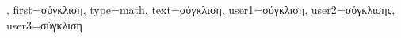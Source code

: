 {{%
},
	first={\foreignlanguage{greek}{σύγκλιση}},
	type=math,
	text={\foreignlanguage{greek}{σύγκλιση}}, 
	user1={\foreignlanguage{greek}{σύγκλιση}}, %
	user2={\foreignlanguage{greek}{σύγκλισης}}, %
	user3={\foreignlanguage{greek}{σύγκλιση}} %
}

